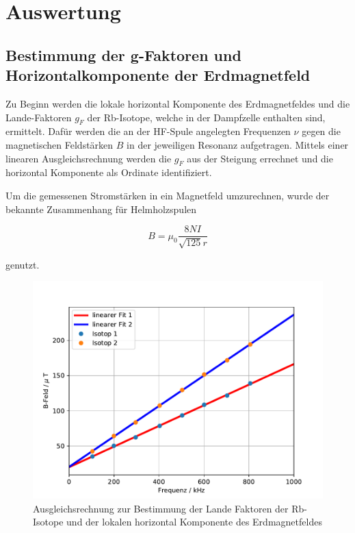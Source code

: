 \section{Auswertung}
\subsection{Bestimmung der g-Faktoren und Horizontalkomponente der Erdmagnetfeld}
Zu Beginn werden die lokale horizontal Komponente des Erdmagnetfeldes und die Lande-Faktoren $g_F$ der Rb-Isotope, welche in der Dampfzelle enthalten sind, ermittelt.
Dafür werden die an der HF-Spule angelegten Frequenzen $\nu$ gegen die magnetischen Feldstärken $B$ in der jeweiligen Resonanz aufgetragen. Mittels einer linearen Ausgleichsrechnung werden die $g_F$ aus der Steigung errechnet und die horizontal Komponente als Ordinate identifiziert.

Um die gemessenen Stromstärken in ein Magnetfeld umzurechnen, wurde der bekannte Zusammenhang für Helmholzspulen

\begin{equation}
B = \mu_0 \frac{8NI}{\sqrt{125} r}
\end{equation}

genutzt.

\begin{figure}[h]
\centering
\includegraphics[scale=0.8]{img/plotLande.pdf}
\caption{Ausgleichsrechnung zur Bestimmung der Lande Faktoren der Rb-Isotope und der lokalen horizontal Komponente des Erdmagnetfeldes}
\label{aufbau}
\end{figure}


